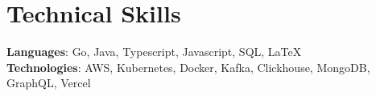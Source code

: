 \section{Technical Skills}
 \begin{itemize}[leftmargin=0.15in, label={}]
    \small{\item{
     \textbf{Languages}{: Go, Java, Typescript, Javascript, SQL, \LaTeX} \\
     \vspace{4pt}
     \textbf{Technologies}{: AWS, Kubernetes, Docker, Kafka, Clickhouse, MongoDB, GraphQL, Vercel} \\
    }}
 \end{itemize}
 \vspace{-16pt}
